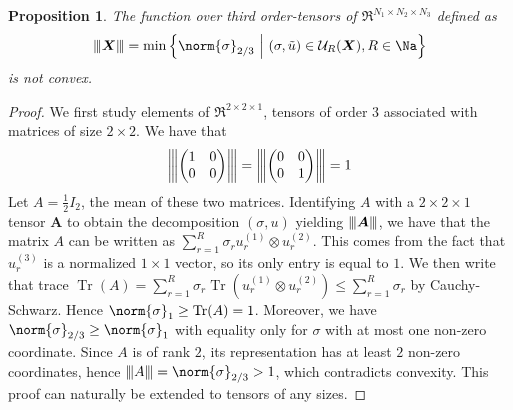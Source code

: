\documentclass{article}
\newtheorem{proposition}{Proposition}
\newcommand{\tensor}[1]{{\bm #1}}
\newcommand{\tens}[1]{\tensor{#1}}
\newcommand{\rk}{R}
\newcommand{\nents}{N}
\newcommand{\unkn}{X}
\newcommand{\allfaccp}{\mathcal{U}_R(\tens{\unkn})}
\newcommand{\opnorm}[1]{{\left\vert\kern-0.25ex\left\vert\kern-0.25ex\left\vert #1 
    \right\vert\kern-0.25ex\right\vert\kern-0.25ex\right\vert}}
\DeclareMathOperator{\Tr}{Tr}
\begin{document}
\begin{proposition}
The function over third order-tensors of  $\Re^{\nents_1 \times \nents_2\times\nents_3}$ defined as
$$\opnorm{\tens{\unkn}} = \min\Big\{ \norm{\sigma}_{2/3}~\Big|~(\sigma, \tilde{u}) \in \allfaccp, \rk\in\Na\Big\}$$
is not convex.
\end{proposition}
\begin{proof}
We first study elements of $\Re^{2\times 2 \times 1}$, tensors of order $3$ associated with matrices of size $2\times 2$. We have that 
\begin{equation}
\opnorm{\begin{pmatrix}
1 & 0 \\
0 & 0
\end{pmatrix}} = \opnorm{\begin{pmatrix}
0 & 0 \\
0 & 1
\end{pmatrix}}= 1
\end{equation}
Let $A=\frac{1}{2}I_2$, the mean of these two matrices. Identifying $A$ with a $2\times 2\times 1$ tensor $\tens{A}$ to obtain the decomposition $(\sigma, u)$ yielding $\opnorm{\tens{A}}$, we have that the matrix $A$ can be written as $\sum_{r=1}^R \sigma_r u^{(1)}_r\otimes u^{(2)}_r$. This comes from the fact that $u^{(3)}_r$ is a normalized $1\times 1$ vector, so its only entry is equal to $1$. We then write that trace $\Tr(A) = \sum_{r=1}^R \sigma_r \Tr( u^{(1)}_r\otimes u^{(2)}_r) \leq \sum_{r=1}^R \sigma_r$ by Cauchy-Schwarz. Hence $\norm{\sigma}_1 \geq \Tr(A) = 1$. Moreover, we have $\norm{\sigma}_{2/3}\geq\norm{\sigma}_1$ with equality only for $\sigma$ with at most one non-zero coordinate. Since $A$ is of rank $2$, its representation has at least $2$ non-zero coordinates, hence $\opnorm{A} = \norm{\sigma}_{2/3} > 1$, which contradicts convexity. This proof can naturally be extended to tensors of any sizes.
\end{proof}

\newpage
\end{document}
